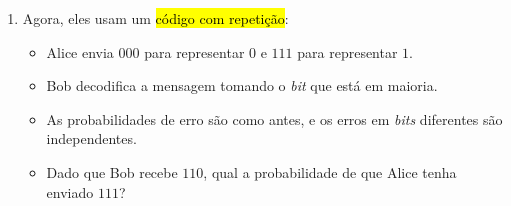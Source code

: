 \documentclass[
  11pt]{report}
\begin{document}
\begin{rmdbox}

\begin{enumerate}
\def\labelenumi{\alph{enumi}.}
\setcounter{enumi}{1}
\item
  Agora, eles usam um {\hl{código com repetição}}:

  \begin{itemize}
  \item
    Alice envia $000$ para representar $0$ e $111$ para representar $1$.
  \item
    Bob decodifica a mensagem tomando o \emph{bit} que está em maioria.
  \item
    As probabilidades de erro são como antes, e os erros em \emph{bits} diferentes são independentes.
  \item
    Dado que Bob recebe $110$, qual a probabilidade de que Alice tenha enviado $111$?
  \end{itemize}
\end{enumerate}

\end{rmdbox}
\end{document}
